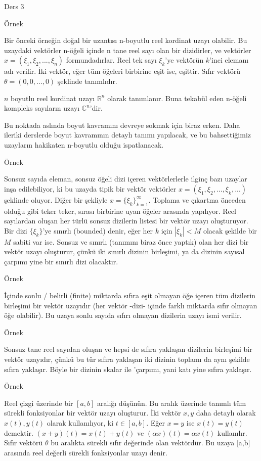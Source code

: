 \documentclass[12pt,fleqn]{article}\usepackage{../../common}
\begin{document}
Ders 3

Örnek 

Bir önceki örneğin doğal bir uzantısı n-boyutlu reel kordinat uzayı
olabilir. Bu uzaydaki vektörler n-öğeli içinde n tane reel sayı olan bir
dizidirler, ve vektörler $x = (\xi_1, \xi_2,...,\xi_n)$
formundadırlar. Reel tek sayı $\xi_k$'ye vektörün $k$'inci elemanı adı
verilir. İki vektör, eğer tüm öğeleri birbirine eşit ise, eşittir. Sıfır
vektörü $\theta = (0,0,...,0)$ şeklinde tanımlıdır. 

$n$ boyutlu reel kordinat uzayı $\mathbb{R}^n$ olarak tanımlanır. Buna
tekabül eden n-öğeli kompleks sayıların uzayı $\mathbb{C}^n$'dir.

Bu noktada aslında boyut kavramını devreye sokmak için biraz erken. Daha
ileriki derslerde boyut kavramının detaylı tanımı yapılacak, ve bu
bahsettiğimiz uzayların hakikaten n-boyutlu olduğu ispatlanacak.

Örnek 

Sonsuz sayıda eleman, sonsuz öğeli dizi içeren vektörlerlerle ilginç bazı
uzaylar inşa edilebiliyor, ki bu uzayda tipik bir vektör vektörler
$x = (\xi_1, \xi_2,...,\xi_k,...)$ şeklinde oluyor. Diğer bir şekliyle
$x = \{\xi_k\}_{k=1}^{\infty}$.  Toplama ve çıkartma önceden olduğu gibi
teker teker, sırası birbirine uyan öğeler arasında yapılıyor. Reel
sayılardan oluşan her türlü sonsuz dizilerin listesi bir vektör uzayı
oluşturuyor. Bir dizi $\{\xi_k\}$'ye sınırlı (bounded) denir, eğer her $k$
için $|\xi_k| < M$ olacak şekilde bir $M$ sabiti var ise. Sonsuz ve sınırlı
(tanımını biraz önce yaptık) olan her dizi bir vektör uzayı oluşturur,
çünkü iki sınırlı dizinin birleşimi, ya da dizinin sayısal çarpımı yine bir
sınırlı dizi olacaktır.

Örnek 

İçinde sonlu / belirli (finite) miktarda sıfıra eşit olmayan öğe içeren tüm
dizilerin birleşimi bir vektör uzayıdır (her vektör -dizi- içinde farklı
miktarda sıfır olmayan öğe olabilir). Bu uzaya sonlu sayıda sıfırı olmayan
dizilerin uzayı ismi verilir. 

Örnek

Sonsuz tane reel sayıdan oluşan ve hepsi de sıfıra yaklaşan dizilerin
birleşimi bir vektör uzayıdır, çünkü bu tür sıfıra yaklaşan iki dizinin
toplamı da aynı şekilde sıfıra yaklaşır. Böyle bir dizinin skalar ile
'çarpımı, yani katı yine sıfıra yaklaşır. 

Örnek 

Reel çizgi üzerinde bir $[a,b]$ aralığı düşünün. Bu aralık üzerinde tanımlı
tüm sürekli fonksiyonlar bir vektör uzayı oluşturur. İki vektör $x,y$ daha
detaylı olarak $x(t),y(t)$ olarak kullanılıyor, ki $t \in [a,b]$. Eğer
$x = y$ ise $x(t) = y(t)$ demektir. $(x+y)(t) = x(t) + y(t)$ ve
$(\alpha x)(t) = \alpha x(t)$ kullanılır. Sıfır vektörü $\theta$ bu
aralıkta sürekli sıfır değerinde olan vektördür.  Bu uzaya [a,b] arasında
reel değerli sürekli fonksiyonlar uzayı denir.
\end{document}
